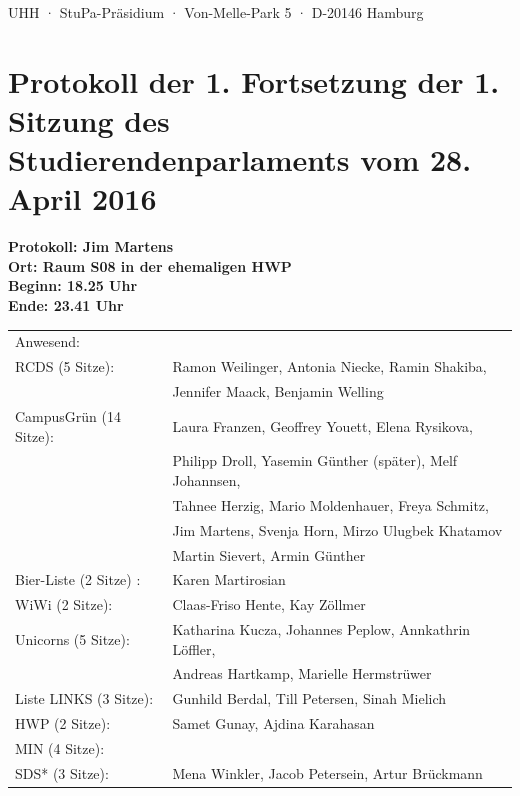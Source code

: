 \documentclass[ngerman,headheight=70pt]{scrartcl}
\begin{document}
    UHH · StuPa-Präsidium · Von-Melle-Park 5 · D-20146 Hamburg

    \section*{Protokoll der 1. Fortsetzung der 1. Sitzung des Studierendenparlaments vom 28. April 2016}

    \textbf{Protokoll: Jim Martens}\\
    \textbf{Ort: Raum S08 in der ehemaligen HWP }\\
    \textbf{Beginn: 18.25 Uhr}\\
    \textbf{Ende: 23.41 Uhr}

    \vspace{0.5cm}
    \begin{tabular}{ll}
        Anwesend: & \\
            RCDS (5 Sitze): & Ramon Weilinger, Antonia Niecke, Ramin Shakiba, \\
                            & Jennifer Maack, Benjamin Welling \\
             CampusGrün (14 Sitze): & Laura Franzen, Geoffrey Youett, Elena Rysikova, \\
                                   & Philipp Droll, Yasemin Günther (später), Melf Johannsen,\\
                                   & Tahnee Herzig, Mario Moldenhauer, Freya Schmitz, \\
                                   & Jim Martens, Svenja Horn, Mirzo Ulugbek Khatamov \\
                                   & Martin Sievert, Armin Günther \\
             Bier-Liste (2 Sitze) : & Karen Martirosian \\
             WiWi (2 Sitze): & Claas-Friso Hente, Kay Zöllmer \\
             Unicorns (5 Sitze): & Katharina Kucza, Johannes Peplow, Annkathrin Löffler, \\
                                 & Andreas Hartkamp, Marielle Hermstrüwer \\
             Liste LINKS (3 Sitze): & Gunhild Berdal, Till Petersen, Sinah Mielich \\
             HWP (2 Sitze): & Samet Gunay, Ajdina Karahasan \\
             MIN (4 Sitze): &  \\
             SDS* (3 Sitze): & Mena Winkler, Jacob Petersein, Artur Brückmann \\

\end{tabular}
\end{document}

